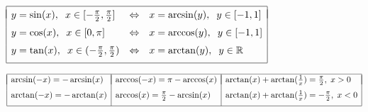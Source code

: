 \documentclass{article}
\begin{document}
$\begin{array}{|lll|}\hline && \\*[-9pt] 
  y=\sin(x),\hspace{2 mm} x\in[-\frac{\pi}{2},\frac{\pi}{2}]&
  \iff &
  x=\arcsin(y),\hspace{2 mm} y\in[-1,1] \EndRow 
  y=\cos(x),\hspace{2 mm} x\in[0,\pi]&
  \iff &
  x=\arccos(y),\hspace{2 mm} y\in[-1,1] \EndRow 
  y=\tan(x),\hspace{2 mm} x\in(-\frac{\pi}{2},\frac{\pi}{2})&
  \iff &
  x=\arctan(y), \hspace{2 mm} y\in\mathbb{R}\\*[6pt]\hline
\end{array}$  

\vspace{5 mm}

$\begin{array}{|l|l|l|}\hline & & \\*[-11pt]
\arcsin(-x)=-\arcsin(x) & \arccos(-x)=\pi-\arccos(x) & 
  \arctan(x)+\arctan(\tfrac1x)=\frac\pi2, \; x>0 \EndRow %
\arctan(-x)=-\arctan(x) &\arccos(x)=\frac{\pi}{2}-\arcsin(x) & 
  \arctan(x)+\arctan(\tfrac1x)=-\frac\pi2, \; x < 0 \\*[6pt] %
\hline
\end{array}$

\vspace{5mm}

\end{document}
